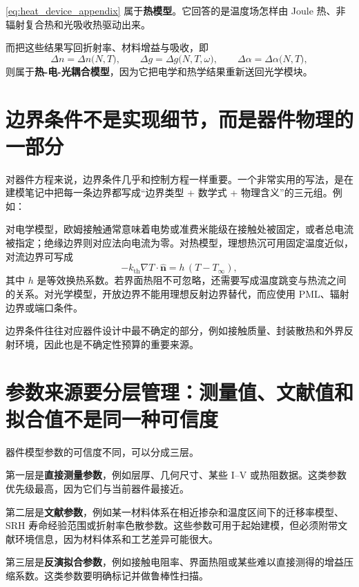 \cref{eq:heat_device_appendix} 属于\textbf{热模型}。它回答的是温度场怎样由 Joule 热、非辐射复合热和光吸收热驱动出来。

而把这些结果写回折射率、材料增益与吸收，即
\begin{equation}
\Delta n = \Delta n\bigl(N,T\bigr),
\qquad
\Delta g = \Delta g\bigl(N,T,\omega\bigr),
\qquad
\Delta\alpha = \Delta\alpha\bigl(N,T\bigr),
\label{eq:coupling_variables_appendix}
\end{equation}
则属于\textbf{热-电-光耦合模型}，因为它把电学和热学结果重新送回光学模块。

\section{边界条件不是实现细节，而是器件物理的一部分}
对器件方程来说，边界条件几乎和控制方程一样重要。一个非常实用的写法，是在建模笔记中把每一条边界都写成“边界类型 + 数学式 + 物理含义”的三元组。例如：

对电学模型，欧姆接触通常意味着电势或准费米能级在接触处被固定，或者总电流被指定；绝缘边界则对应法向电流为零。对热模型，理想热沉可用固定温度近似，对流边界可写成
\begin{equation}
-k_{\mathrm{th}}\nabla T\cdot\hat{\bm n}
=
h\,(T-T_\infty),
\label{eq:convective_bc_appendix}
\end{equation}
其中 $h$ 是等效换热系数。若界面热阻不可忽略，还需要写成温度跳变与热流之间的关系。对光学模型，开放边界不能用理想反射边界替代，而应使用 PML、辐射边界或端口条件。

边界条件往往对应器件设计中最不确定的部分，例如接触质量、封装散热和外界反射环境，因此也是不确定性预算的重要来源。

\section{参数来源要分层管理：测量值、文献值和拟合值不是同一种可信度}
器件模型参数的可信度不同，可以分成三层。

第一层是\textbf{直接测量参数}，例如层厚、几何尺寸、某些 I--V 或热阻数据。这类参数优先级最高，因为它们与当前器件最接近。

第二层是\textbf{文献参数}，例如某一材料体系在相近掺杂和温度区间下的迁移率模型、SRH 寿命经验范围或折射率色散参数。这些参数可用于起始建模，但必须附带文献环境信息，因为材料体系和工艺差异可能很大。

第三层是\textbf{反演拟合参数}，例如接触电阻率、界面热阻或某些难以直接测得的增益压缩系数。这类参数要明确标记并做鲁棒性扫描。

